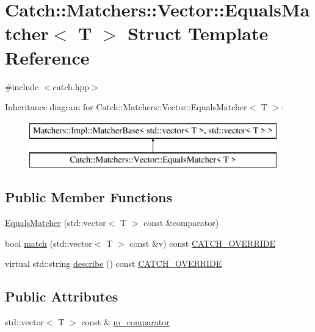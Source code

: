\hypertarget{structCatch_1_1Matchers_1_1Vector_1_1EqualsMatcher}{\section{Catch\-:\-:Matchers\-:\-:Vector\-:\-:Equals\-Matcher$<$ T $>$ Struct Template Reference}
\label{structCatch_1_1Matchers_1_1Vector_1_1EqualsMatcher}
}


{\ttfamily \#include $<$catch.\-hpp$>$}

Inheritance diagram for Catch\-:\-:Matchers\-:\-:Vector\-:\-:Equals\-Matcher$<$ T $>$\-:\begin{figure}[H]
\begin{center}
\leavevmode
\includegraphics[height=2.000000cm]{structCatch_1_1Matchers_1_1Vector_1_1EqualsMatcher}
\end{center}
\end{figure}
\subsection*{Public Member Functions}
\begin{DoxyCompactItemize}
\item 
\hyperlink{structCatch_1_1Matchers_1_1Vector_1_1EqualsMatcher_a3846c47780d1991dcfe87aefded98008}{Equals\-Matcher} (std\-::vector$<$ T $>$ const \&comparator)
\item 
bool \hyperlink{structCatch_1_1Matchers_1_1Vector_1_1EqualsMatcher_aca444c319d1b4c6f538faf9c4735da04}{match} (std\-::vector$<$ T $>$ const \&v) const \hyperlink{catch_8hpp_a8ecdce4d3f57835f707915ae831eb847}{C\-A\-T\-C\-H\-\_\-\-O\-V\-E\-R\-R\-I\-D\-E}
\item 
virtual std\-::string \hyperlink{structCatch_1_1Matchers_1_1Vector_1_1EqualsMatcher_aca79ade26f4a75b2a57005067e086e35}{describe} () const \hyperlink{catch_8hpp_a8ecdce4d3f57835f707915ae831eb847}{C\-A\-T\-C\-H\-\_\-\-O\-V\-E\-R\-R\-I\-D\-E}
\end{DoxyCompactItemize}
\subsection*{Public Attributes}
\begin{DoxyCompactItemize}
\item 
std\-::vector$<$ T $>$ const \& \hyperlink{structCatch_1_1Matchers_1_1Vector_1_1EqualsMatcher_a56f7aa6f110a12b1b9aeb0cabbc9d755}{m\-\_\-comparator}
\end{DoxyCompactItemize}


